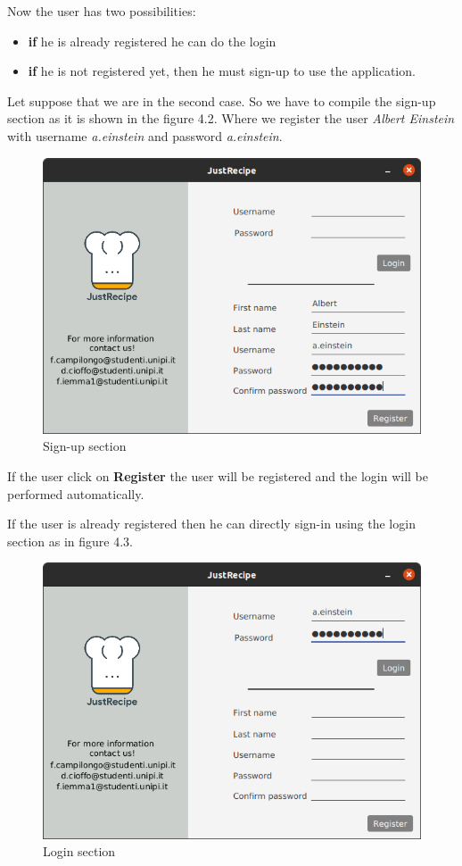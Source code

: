 \documentclass[a4paper]{report}
\begin{document}
\noindent Now the user has two possibilities:
\begin{itemize}
	\item \textbf{if} he is already registered he can do the login
	\item \textbf{if} he is not registered yet, then he must sign-up to use the application.
\end{itemize}

\noindent Let suppose that we are in the second case. So we have to compile the sign-up section as it is shown in the figure 4.2. Where we register the user \emph{Albert Einstein} with username \emph{a.einstein} and password \emph{a.einstein}. 

\begin{figure}[htpb]
	\centering
	\includegraphics[scale=0.3]{img/user_manual/register.png}
	\caption{Sign-up section}
\end{figure}

\noindent If the user click on \textbf{Register} the user will be registered and the login will be performed automatically.

\noindent If the user is already registered then he can directly sign-in using the login section as in figure 4.3.

\begin{figure}[htpb]
	\centering
	\includegraphics[scale=0.3]{img/user_manual/loginsection.png}
	\caption{Login section}
\end{figure}
\end{document}
